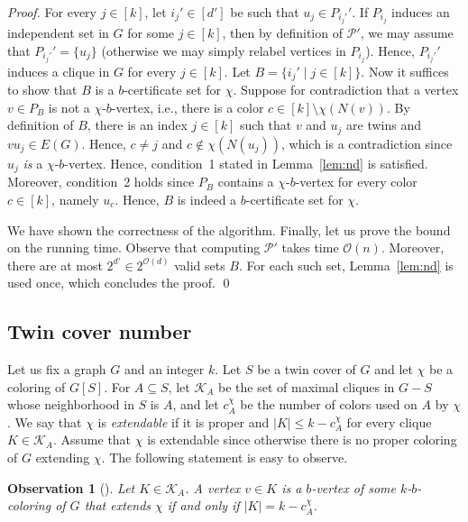 \documentclass[runningheads, envcountsame]{llncs}
\newcommand{\sep}{\;|\;}
\newcommand{\seq}{\subseteq}
\newcommand{\ca}{\mathcal}
\newtheorem{observation}[theorem]{Observation}
\begin{document}
\begin{proof}
For every $j \in [k]$, let $i_j' \in [d']$ be such that $u_j \in P_{i_j'}'$.
If $P_{i_j}$ induces an independent set in $G$ for some $j \in [k]$, then by definition of $\ca P'$, we may assume that $P_{i_j'}' = \{u_j\}$ (otherwise we may simply relabel vertices in $P_{i_j}$).
Hence, $P_{i_j'}'$ induces a clique in $G$ for every $j \in [k]$.
Let $B = \{i_j' \sep j \in [k]\}$.
Now it suffices to show that $B$ is a $b$-certificate set for $\chi$.
Suppose for contradiction that a vertex $v \in P_B$ is not a $\chi$-$b$-vertex, i.e., there is a color $c \in [k] \setminus \chi(N(v))$.
By definition of $B$, there is an index $j \in [k]$ such that $v$ and $u_j$ are twins and $vu_j \in E(G)$.
Hence, $c \ne j$ and $c \notin \chi(N(u_j))$, which is a contradiction since $u_j$ \emph{is} a $\chi$-$b$-vertex.
Hence, condition~1 stated in Lemma~\ref{lem:nd} is satisfied.
Moreover, condition~2 holds since $P_B$ contains a $\chi$-$b$-vertex for every color $c \in [k]$, namely $u_c$.
Hence, $B$ is indeed a $b$-certificate set for $\chi$.

We have shown the correctness of the algorithm. Finally, let us prove the bound on the running time. Observe that computing $\ca P'$ takes time $\ca O(n)$. Moreover, there are at most $2^{d'} \in 2^{\ca O(d)}$ valid sets $B$.
For each such set, Lemma~\ref{lem:nd} is used once, which concludes the proof.
\qed\end{proof}

\subsection{Twin cover number}

Let us fix a graph $G$ and an integer $k$. Let $S$ be a twin cover of $G$ and let $\chi$ be a coloring of $G[S]$.
For $A \seq S$, let $\ca K_A$ be the set of maximal cliques in $G-S$ whose neighborhood in $S$ is $A$, and let $c_A^\chi$ be the number of colors used on $A$ by $\chi$.
We say that $\chi$ is \emph{extendable} if it is proper and $|K| \le k - c_A^\chi$ for every clique $K \in \ca K_A$.
Assume that $\chi$ is extendable since otherwise there is no proper coloring of $G$ extending $\chi$.
The following statement is easy to observe.

\begin{observation}[{\cite[Observation 18, typo fixed]{JaffkeLS23}}]\label{obs:tc-b}
Let $K \in \ca K_A$. A vertex $v \in K$ is a $b$-vertex of some $k$-$b$-coloring of $G$ that extends $\chi$ if and only if $|K| = k - c^\chi_A$.
\end{observation}
\end{document}
